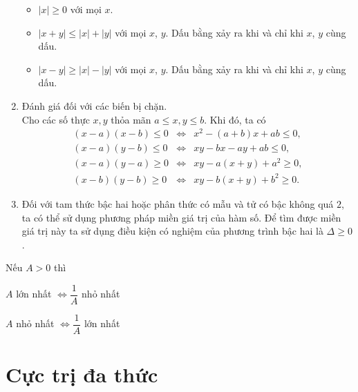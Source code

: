 \begin{enumerate}
	\begin{itemize}
		\item $|x|\geq 0$ với mọi $x$.
		\item $|x+y|\leq |x|+|y|$ với mọi $x$, $y$. Dấu bằng xảy ra khi và chỉ khi $x$, $y$ cùng dấu.
		\item $|x-y|\geq |x|-|y|$ với mọi $x$, $y$. Dấu bằng xảy ra khi và chỉ khi $x$, $y$ cùng dấu.
	\end{itemize}
    \item Đánh giá đối với các biến bị chặn.
    \\ Cho các số thực $x,y$ thỏa mãn $a \leq x,y \leq b$. Khi đó, ta có
    {\allowdisplaybreaks
    	\begin{eqnarray*}
    		(x-a)(x-b) \leq 0 &\Leftrightarrow & x^2 -(a+b)x +ab \leq 0, \\
    		(x-a)(y-b) \leq 0 &\Leftrightarrow& xy - bx- ay +ab \leq 0, \\
    		(x-a)(y-a) \geq 0 &\Leftrightarrow& xy - a(x+y) +a^2 \geq 0, \\
    		(x-b)(y-b) \geq 0 &\Leftrightarrow& xy - b(x+y) +b^2 \geq 0.
    \end{eqnarray*}}
	\item Đối với tam thức bậc hai hoặc phân thức có mẫu và tử có bậc không quá $2$, ta có thể sử dụng phương pháp miền giá trị của hàm số. Để tìm được miền giá trị này ta sử dụng điều kiện có nghiệm của phương trình bậc hai là $\Delta\geq 0$.
\end{enumerate}	
\begin{note}
	Nếu $A>0$ thì
	\begin{enumEX}{2}
		\item $A$ lớn nhất $\Leftrightarrow \dfrac{1}{A}$ nhỏ nhất
		\item $A$ nhỏ nhất $\Leftrightarrow \dfrac{1}{A}$ lớn nhất
	\end{enumEX}
\end{note}

\section{Cực trị đa thức}

